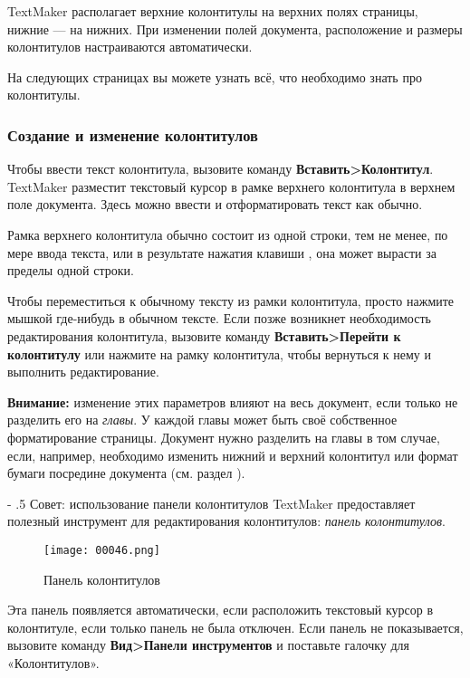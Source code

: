 ﻿\documentclass[a4paper,10pt]{article}
\makeatletter
\renewcommand\paragraph{%
   \@startsection{paragraph}{4}{0mm}%
      {-\baselineskip}%
      {.5\baselineskip}%
      {\normalfont\normalsize\bfseries}}
\makeatother
\begin{document}
TextMaker располагает верхние колонтитулы на верхних полях страницы, нижние — на нижних. При изменении полей документа, расположение и размеры колонтитулов настраиваются автоматически.

На следующих страницах вы можете узнать всё, что необходимо знать про колонтитулы.

\subsubsection{Создание и изменение колонтитулов}
Чтобы ввести текст колонтитула, вызовите команду \textbf{Вставить>Колонтитул}. TextMaker разместит текстовый курсор в рамке верхнего колонтитула в верхнем поле документа. Здесь можно ввести и отформатировать текст как обычно.

Рамка верхнего колонтитула обычно состоит из одной строки, тем не менее, по мере ввода текста, или в результате нажатия клавиши , она может вырасти за пределы одной строки.

Чтобы переместиться к обычному тексту из рамки колонтитула, просто нажмите мышкой где-нибудь в обычном тексте. Если позже возникнет необходимость редактирования колонтитула, вызовите команду \textbf{Вставить>Перейти к колонтитулу} или нажмите на рамку колонтитула, чтобы вернуться к нему и выполнить редактирование.

\begin{mdframed}[backgroundcolor=blue!10]
\textbf{Внимание:} изменение этих параметров влияют на весь документ, если только не разделить его на \textit{главы}. У каждой главы может быть своё собственное форматирование страницы. Документ нужно разделить на главы в том случае, если, например, необходимо изменить нижний и верхний колонтитул или формат бумаги посредине документа (см. раздел ).
\end{mdframed}

\paragraph{Совет: использование панели колонтитулов}
TextMaker предоставляет полезный инструмент для редактирования колонтитулов: \textit{панель колонтитулов}.

\begin{figure}[ht]
\texttt{[image: 00046.png]}
\centering
\caption{Панель колонтитулов}
\end{figure}

Эта панель появляется автоматически, если расположить текстовый курсор в колонтитуле, если только панель не была отключен. Если панель не показывается, вызовите команду \textbf{Вид>Панели инструментов} и поставьте галочку для «Колонтитулов».
\end{document}
